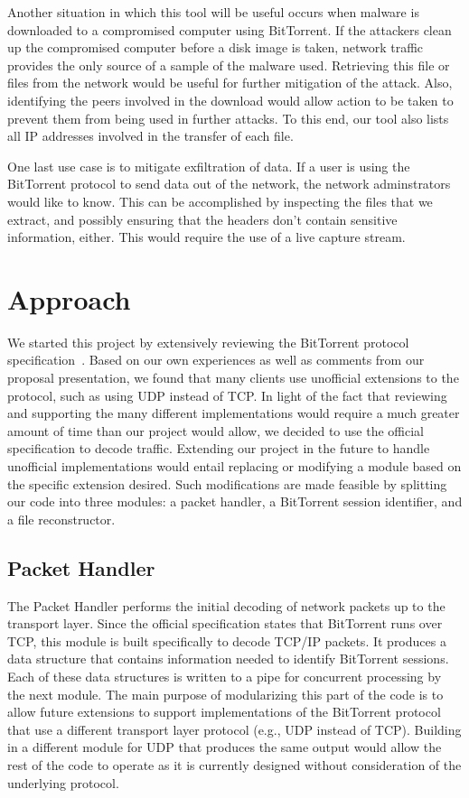 \documentclass{acm_proc_article-sp}
\begin{document}
Another situation in which this tool will be useful occurs when malware is
downloaded to a compromised computer using BitTorrent. If the attackers clean up
the compromised computer before a disk image is taken, network traffic provides
the only source of a sample of the malware used. Retrieving this file or files
from the network would be useful for further mitigation of the attack. Also,
identifying the peers involved in the download would allow action to be taken to
prevent them from being used in further attacks. To this end, our tool also
lists all IP addresses involved in the transfer of each file.

One last use case is to mitigate exfiltration of data.  If a user is
using the BitTorrent protocol to send data out of the network, the network
adminstrators would like to know.  This can be accomplished by inspecting the
files that we extract, and possibly ensuring that the headers don't contain
sensitive information, either.  This would require the use of a live capture stream.


\section{Approach}
We started this project by extensively reviewing the BitTorrent protocol
specification~\cite{officialspec}.  Based on our own experiences as well as
comments from our proposal presentation, we found that many clients use
unofficial extensions to the protocol, such as using UDP instead of TCP. In
light of the fact that reviewing and supporting the many different
implementations would require a much greater amount of time than our project
would allow, we decided to use the official specification to decode
traffic. Extending our project in the future to handle unofficial
implementations would entail replacing or modifying a module based on the
specific extension desired. Such modifications are made feasible by splitting
our code into three modules: a packet handler, a BitTorrent session identifier,
and a file reconstructor.

\subsection{Packet Handler}
The Packet Handler performs the initial decoding of network packets up to the
transport layer. Since the official specification states that BitTorrent runs
over TCP, this module is built specifically to decode TCP/IP packets. It
produces a data structure that contains information needed to identify
BitTorrent sessions. Each of these data structures is written to a pipe for
concurrent processing by the next module. The main purpose of modularizing this
part of the code is to allow future extensions to support implementations of the
BitTorrent protocol that use a different transport layer protocol (e.g., UDP
instead of TCP). Building in a different module for UDP that produces the same
output would allow the rest of the code to operate as it is currently designed
without consideration of the underlying protocol.
\end{document}
